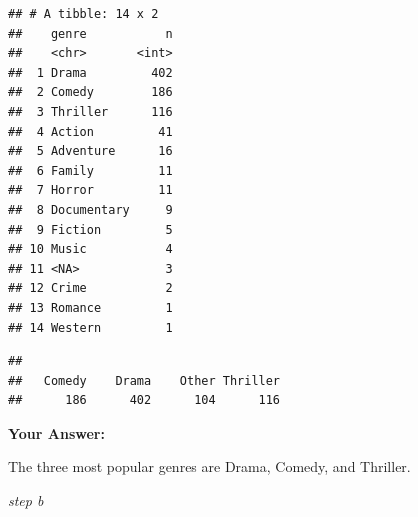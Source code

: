 \documentclass[
]{article}
\newenvironment{Shaded}{\begin{snugshade}}{\end{snugshade}}
\newcommand{\AttributeTok}[1]{\textcolor[rgb]{0.13,0.29,0.53}{#1}}
\newcommand{\CommentTok}[1]{\textcolor[rgb]{0.56,0.35,0.01}{\textit{#1}}}
\newcommand{\ConstantTok}[1]{\textcolor[rgb]{0.56,0.35,0.01}{#1}}
\newcommand{\FunctionTok}[1]{\textcolor[rgb]{0.13,0.29,0.53}{\textbf{#1}}}
\newcommand{\NormalTok}[1]{#1}
\newcommand{\OtherTok}[1]{\textcolor[rgb]{0.56,0.35,0.01}{#1}}
\newcommand{\SpecialCharTok}[1]{\textcolor[rgb]{0.81,0.36,0.00}{\textbf{#1}}}
\newcommand{\StringTok}[1]{\textcolor[rgb]{0.31,0.60,0.02}{#1}}
\begin{document}
\begin{verbatim}
## # A tibble: 14 x 2
##    genre           n
##    <chr>       <int>
##  1 Drama         402
##  2 Comedy        186
##  3 Thriller      116
##  4 Action         41
##  5 Adventure      16
##  6 Family         11
##  7 Horror         11
##  8 Documentary     9
##  9 Fiction         5
## 10 Music           4
## 11 <NA>            3
## 12 Crime           2
## 13 Romance         1
## 14 Western         1
\end{verbatim}

\begin{Shaded}
\end{Shaded}

\begin{verbatim}
## 
##   Comedy    Drama    Other Thriller 
##      186      402      104      116
\end{verbatim}

\textbf{Your Answer:}

The three most popular genres are Drama, Comedy, and Thriller.

\emph{step b}

\begin{Shaded}
\end{Shaded}
\end{document}
